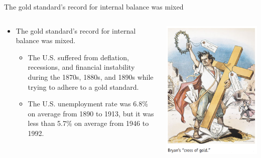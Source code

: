 \documentclass[10pt,hyperref={CJKbookmarks=true},xcolor=dvipsnames,aspectratio=169]{beamer}
\begin{document}
\begin{frame}{The gold standard’s record for internal balance was
	mixed}

\begin{columns}[onlytextwidth]
	\begin{column}{0.6\textwidth}
		\begin{itemize}
		
				\item The gold standard’s record for internal balance was
				mixed.
			\begin{itemize}
			\item The U.S. suffered from deflation, recessions, and financial
			instability during the 1870s, 1880s, and 1890s while
			trying to adhere to a gold standard.
			\item The U.S. unemployment rate was 6.8\% on average from
			1890 to 1913, but it was less than 5.7\% on average from
			1946 to 1992.
		\end{itemize}	
	\end{itemize}
	\end{column}
	\begin{column}{0.4\textwidth}
		\centering
		\includegraphics[scale=0.3]{fig/systems/bryan}
	\end{column}
\end{columns}

\end{frame}
\end{document}
